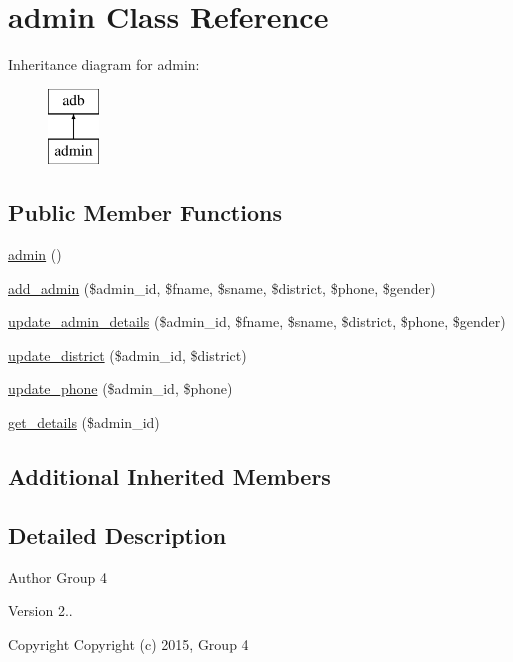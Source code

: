 \hypertarget{classadmin}{}\section{admin Class Reference}
\label{classadmin}
Inheritance diagram for admin\+:\begin{figure}[H]
\begin{center}
\leavevmode
\includegraphics[height=2.000000cm]{classadmin}
\end{center}
\end{figure}
\subsection*{Public Member Functions}
\begin{DoxyCompactItemize}
\item 
\hyperlink{classadmin_a0418d22e14785132c232ef68a32d0659}{admin} ()
\item 
\hyperlink{classadmin_a91081e56c5f73539a6da952dafeee708}{add\+\_\+admin} (\$admin\+\_\+id, \$fname, \$sname, \$district, \$phone, \$gender)
\item 
\hyperlink{classadmin_a4ab72be98fb33a23a74801af62b8291c}{update\+\_\+admin\+\_\+details} (\$admin\+\_\+id, \$fname, \$sname, \$district, \$phone, \$gender)
\item 
\hyperlink{classadmin_a6a2db62abcb2cff67b3c3e709cc2eb2a}{update\+\_\+district} (\$admin\+\_\+id, \$district)
\item 
\hyperlink{classadmin_ac3647f61b1151e2adf2e8871d43adfc6}{update\+\_\+phone} (\$admin\+\_\+id, \$phone)
\item 
\hyperlink{classadmin_a4c930c61e605dcebacaec97c32b59f30}{get\+\_\+details} (\$admin\+\_\+id)
\end{DoxyCompactItemize}
\subsection*{Additional Inherited Members}


\subsection{Detailed Description}
\begin{DoxyAuthor}{Author}
Group 4 
\end{DoxyAuthor}
\begin{DoxyVersion}{Version}
2.. 
\end{DoxyVersion}
\begin{DoxyCopyright}{Copyright}
Copyright (c) 2015, Group 4 
\end{DoxyCopyright}


